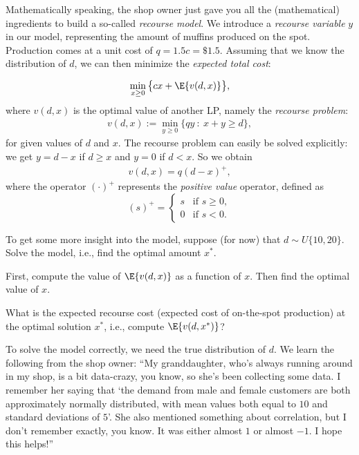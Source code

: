 Mathematically speaking, the shop owner just gave you all the (mathematical) ingredients to build a so-called \textit{recourse model}. We introduce a \textit{recourse variable} $y$ in our model, representing the amount of muffins produced on the spot. Production comes at a unit cost of $q = 1.5 c = \$ 1.5$. Assuming that we know the distribution of $d$, we can then minimize the \textit{expected total cost}:

\begin{align}
    \min_{x \geq 0} \big\{ cx + \E{v(d,x)} \big\},
\end{align}
where $v(d,x)$ is the optimal value of another LP, namely the \textit{recourse problem}:
\begin{align}
    v(d,x) := \min_{y \geq 0} \{ qy \ : \ x + y \geq d \},
\end{align}
for given values of $d$ and $x$. The recourse problem can easily be solved explicitly: we get $y=d-x$ if $d \geq x$ and $y=0$ if $d < x$. So we obtain
\begin{align}
    v(d,x) = q (d - x)^+,
\end{align}
where the operator $(\cdot)^+$ represents the \textit{positive value} operator, defined as
\begin{equation}
    (s)^+ = \begin{cases}
    s &\text{if } s \geq 0,\\
    0 &\text{if } s < 0.
    \end{cases}
\end{equation}

\begin{exercise}
To get some more insight into the model, suppose (for now) that $d \sim U\{10, 20\}$.
Solve the model, i.e., find the optimal amount $x^*$.
\begin{hint}
First, compute the value of $\E{v(d,x)}$ as a function of $x$. Then find the optimal value of $x$.
\end{hint}
\end{exercise}

\begin{exercise}
 What is the expected recourse cost (expected cost of on-the-spot production) at the optimal solution $x^*$, i.e., compute $\E{v(d,x^*)}$?
\end{exercise}

To solve the model correctly, we need the true distribution of $d$. We learn the following from the shop owner: ``My granddaughter, who's always running around in my shop, is a bit data-crazy, you know, so she's been collecting some data. I remember her saying that `the demand from male and female customers are both approximately normally distributed, with mean values both equal to $10$ and standard deviations of $5$'. She also mentioned something about correlation, but I don't remember exactly, you know. It was either almost $1$ or almost $-1$. I hope this helps!''

